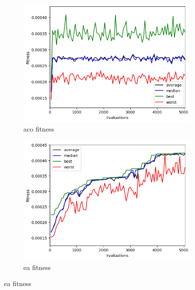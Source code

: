 \begin{figure}[H]
    \centering
    \begin{subfigure}[t]{0.5\textwidth}
        \centering
        \includegraphics[width=\linewidth]{images/lab7/tsp_100gen_fitness_aco.png}
        \caption{aco fitness}
    \end{subfigure}%
    \begin{subfigure}[t]{0.5\textwidth}
        \centering
        \includegraphics[width=\linewidth]{images/lab7/tsp_100gen_fitness_ea.png}
        \caption{ea fitness}
    \end{subfigure}
\end{figure}

